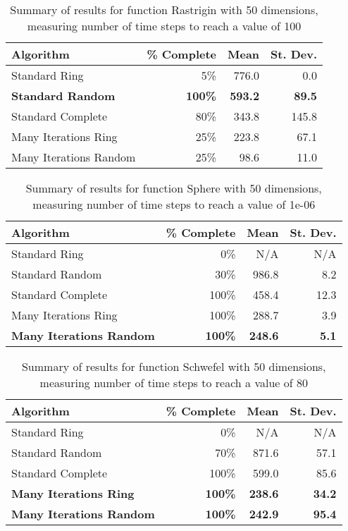 \documentclass[smallcondensed]{svjour3}
\begin{document}
\begin{table}
  \caption{Summary of results for function Rastrigin with 50 dimensions,
  measuring number of time steps to reach a value of 100}
  \label{tab:rastrigin-50}
  \centering
  \begin{tabular}{|l|r|r|r|}
  \hline
  Algorithm&\% Complete&Mean&St. Dev.\\
  \hline
  \hline
  Standard Ring&5\%&776.0&0.0\\
  \hline
  \textbf{Standard Random}&\textbf{100\%}&\textbf{593.2}&\textbf{89.5}\\
  \hline
  Standard Complete&80\%&343.8&145.8\\
  \hline
  Many Iterations Ring&25\%&223.8&67.1\\
  \hline
  Many Iterations Random&25\%&98.6&11.0\\
  \hline
  \end{tabular}
\end{table}

\begin{table}
  \caption{Summary of results for function Sphere with 50 dimensions,
  measuring number of time steps to reach a value of 1e-06}
  \label{tab:sphere-50}
  \centering
  \begin{tabular}{|l|r|r|r|}
  \hline
  Algorithm&\% Complete&Mean&St. Dev.\\
  \hline
  \hline
  Standard Ring&0\%&N/A&N/A\\
  \hline
  Standard Random&30\%&986.8&8.2\\
  \hline
  Standard Complete&100\%&458.4&12.3\\
  \hline
  Many Iterations Ring&100\%&288.7&3.9\\
  \hline
  \textbf{Many Iterations Random}&\textbf{100\%}&\textbf{248.6}&\textbf{5.1}\\
  \hline
  \end{tabular}
\end{table}

\begin{table}
  \caption{Summary of results for function Schwefel with 50 dimensions,
  measuring number of time steps to reach a value of 80}
  \label{tab:schwefel-50}
  \centering
  \begin{tabular}{|l|r|r|r|}
  \hline
  Algorithm&\% Complete&Mean&St. Dev.\\
  \hline
  \hline
  Standard Ring&0\%&N/A&N/A\\
  \hline
  Standard Random&70\%&871.6&57.1\\
  \hline
  Standard Complete&100\%&599.0&85.6\\
  \hline
  \textbf{Many Iterations Ring}&\textbf{100\%}&\textbf{238.6}&\textbf{34.2}\\
  \hline
  \textbf{Many Iterations Random}&\textbf{100\%}&\textbf{242.9}&\textbf{95.4}\\
  \hline
  \end{tabular}
\end{table}
\end{document}
